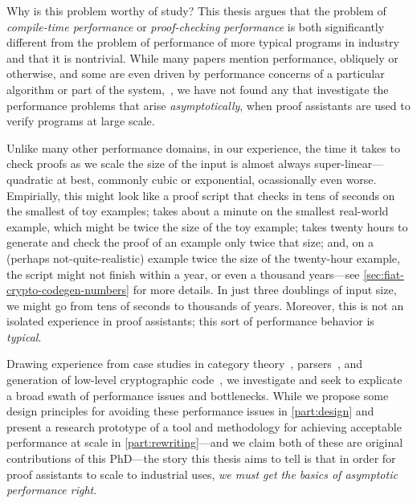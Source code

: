 Why is this problem worthy of study?
This thesis argues that the problem of \emph{compile-time performance} or \emph{proof-checking performance} is both significantly different from the problem of performance of more typical programs in industry and that it is nontrivial.
While many papers mention performance, obliquely or otherwise, and some are even driven by performance concerns of a particular algorithm or part of the system,~\cites[p.~1382]{gonthier2008formal}{Efficiency1994Boulton}{Proving2005Benjamin}{Idris2Faster2020Brady}{Recognizing1989Benanav}{mechanical1990Pierce}{CelikETAL17iCoq}{PalmskogETAL18piCoq}{Gregoire-Leroy-02}{thesis-nogin}{Idris2Faster2020Brady}, we have not found any that investigate the performance problems that arise \emph{asymptotically}, when proof assistants are used to verify programs at large scale.

Unlike many other performance domains, in our experience, the time it takes to check proofs as we scale the size of the input is almost always super-linear---quadratic at best, commonly cubic or exponential, ocassionally even worse.
Empirially, this might look like a proof script that checks in tens of seconds on the smallest of toy examples; takes about a minute on the smallest real-world example, which might be twice the size of the toy example; takes twenty hours to generate and check the proof of an example only twice that size; and, on a (perhaps not-quite-realistic) example twice the size of the twenty-hour example, the script might not finish within a year, or even a thousand years---see \autoref{sec:fiat-crypto-codegen-numbers} for more details.
In just three doublings of input size, we might go from tens of seconds to thousands of years.
Moreover, this is not an isolated experience in proof assistants; this sort of performance behavior is \emph{typical}.

Drawing experience from case studies in category theory~\cite{category-coq-experience}, parsers~\cite{jgross-masters-thesis}, and generation of low-level cryptographic code~\cite{FiatCryptoSP19}, we investigate and seek to explicate a broad swath of performance issues and bottlenecks.
While we propose some design principles for avoiding these performance issues in \autoref{part:design} and present a research prototype of a tool and methodology for achieving acceptable performance at scale in \autoref{part:rewriting}---and we claim both of these are original contributions of this PhD---the story this thesis aims to tell is that in order for proof assistants to scale to industrial uses, \emph{we must get the basics of asymptotic performance right}.

